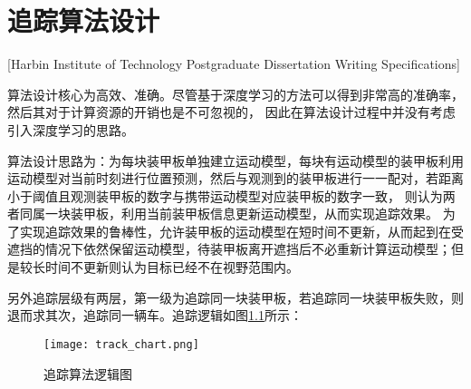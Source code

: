 

\chapter[追踪算法设计]{追踪算法设计}[Harbin Institute of Technology Postgraduate Dissertation Writing Specifications]

算法设计核心为高效、准确。尽管基于深度学习的方法\citep{zhang2021fairmot,meinhardt2022trackformer,li2019evolution,zhou2020tracking,bewley2016simple}可以得到非常高的准确率，然后其对于计算资源的开销也是不可忽视的，
因此在算法设计过程中并没有考虑引入深度学习的思路。\par
算法设计思路为：为每块装甲板单独建立运动模型，每块有运动模型的装甲板利用运动模型对当前时刻进行位置预测，然后与观测到的装甲板进行一一配对，若距离小于阈值且观测装甲板的数字与携带运动模型对应装甲板的数字一致，
则认为两者同属一块装甲板，利用当前装甲板信息更新运动模型，从而实现追踪效果。
为了实现追踪效果的鲁棒性，允许装甲板的运动模型在短时间不更新，从而起到在受遮挡的情况下依然保留运动模型，待装甲板离开遮挡后不必重新计算运动模型；但是较长时间不更新则认为目标已经不在视野范围内。
\par

另外追踪层级有两层，第一级为追踪同一块装甲板，若追踪同一块装甲板失败，则退而求其次，追踪同一辆车。追踪逻辑如图\ref{追踪算法逻辑图}所示：

\begin{figure}[H]
    \centering
    \texttt{[image: track\_chart.png]} 
    \caption{追踪算法逻辑图} 
    \label{追踪算法逻辑图} 
\end{figure} 


